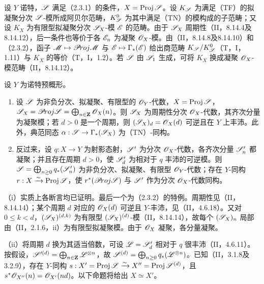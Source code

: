设 $Y$ 诺特，$\mathscr S$ 满足（2.3.1）的条件，$X=\operatorname{Proj}\mathscr S$。设 $K_{\mathscr S}$ 为满足（TF）的拟凝聚分次 $\mathscr S$-模所成阿贝尔范畴，$K_{\mathscr S}^0$ 为其中满足（TN）的模构成的子范畴；又设 $K_X$ 为有限型拟凝聚分次 $\mathscr S_X$-模 $\mathscr E$ 的范畴。由于 $\mathscr S_X$ 周期性（II，8.14.4及8.14.12），后一条件也等价于各 $\mathscr E_n$ 为凝聚 $\mathscr O_X$-模。由（II，8.14.8及8.14.10）和（2.3.2），函子 $\mathscr M\mapsto\mathscr{P}\!roj\mathscr M$ 与 $\mathscr E\mapsto\Gamma_*(\mathscr E)$ 给出商范畴 $K_{\mathscr S}/K_{\mathscr S}^0$（T，I，1.11）与 $K_X$ 的等价（T，I，1.2）。若 $\mathscr S$ 由 $\mathscr S_1$ 生成，可将 $K_X$ 换成凝聚 $\mathscr O_X$-模范畴（II，8.14.12）。

设 $Y$ 为诺特预概形。
\begin{enumerate}[label=(\roman*)]
\item 设 $\mathscr S$ 为非负分次、拟凝聚、有限型的 $\mathscr O_Y$-代数，$X=\operatorname{Proj}\mathscr S$，$\mathscr S_X=\mathscr{P}\!roj\mathscr S=\bigoplus_{n\in\mathbf Z}\mathscr O_X(n)$。则 $\mathscr S_X$ 为周期性分次 $\mathscr O_X$-代数，其齐次分量为凝聚模；若 $d>0$ 是一个周期，则 $(\mathscr S_X)_d=\mathscr O_X(d)$ 可逆且在 $Y$ 上丰沛。此外，典范同态 $\alpha:\mathscr S\to\Gamma_*(\mathscr S_X)$ 为（TN）-同构。
\item 反过来，设 $q:X\to Y$ 为射影态射，$\mathscr S'$ 为分次 $\mathscr O_X$-代数，各齐次分量 $\mathscr S'_n$ 都凝聚；并且存在周期 $d>0$，使 $\mathscr S'_d$ 为相对于 $q$ 丰沛的可逆模。则 $\mathscr S=\bigoplus_{n\geq0}q_*(\mathscr S'_n)$ 为非负分次、拟凝聚、有限型 $\mathscr O_Y$-代数；存在 $Y$-同构 $r:X\xrightarrow{\sim}\operatorname{Proj}\mathscr S$，使 $r^*(\mathscr{P}\!roj\mathscr S)$ 与 $\mathscr S'$ 作为分次 $\mathscr O_X$-代数同构。
\end{enumerate}
\eproof（i）实质上各断言均已证明。最后一个为（2.3.2）的特例。周期性见（II，8.14.14）；某个周期 $d$ 对应的 $\mathscr O_X(d)$ 可逆且 $Y$-丰沛，见（II，4.6.18）。又对 $0\leq k<d$，$(\mathscr S_X)^{(d,k)}$ 为有限型 $(\mathscr S_X)^{(d)}$-模（II，8.14.14），故每个 $(\mathscr S_X)_n$ 局部由（II，2.1.6，ii）为有限型拟凝聚模。由于 $\mathscr O_X$ 凝聚，各分量凝聚。

（ii）将周期 $d$ 换为其适当倍数，可设 $\mathscr L=\mathscr S'_d$ 相对于 $q$ 很丰沛（II，4.6.11）。按假设，$\mathscr S'^{(d)}=\bigoplus_{n\in\mathbf Z}\mathscr L^{\otimes n}$，故 $\mathscr S^{(d)}=\bigoplus_{n\geq0}q_*(\mathscr L^{\otimes n})$。已知（II，3.1.8及3.2.9），存在 $Y$-同构
$s:X'=\operatorname{Proj}\mathscr S\xrightarrow{\sim} X''=\operatorname{Proj}\mathscr S^{(d)}$，且 $s^*\mathscr O_{X''}(n)=\mathscr O_{X'}(nd)$。以下命题将给出 $X\simeq X'$。

